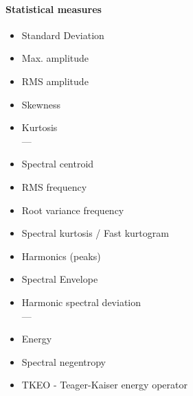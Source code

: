 \paragraph{Statistical measures}
\begin{itemize}
\item Standard Deviation
\item Max. amplitude
\item RMS amplitude
\item Skewness
\item Kurtosis \\
---
\item Spectral centroid
\item RMS frequency
\item Root variance frequency
\item Spectral kurtosis / Fast kurtogram
\item Harmonics (peaks) 
	\cite{hatem_comparative_2018}
	\cite{bishop_multi-scale_2018}
	\cite{adikaram_non-parametric_2016}
	\cite{gerber_identification_2013}
	\cite{nunes_evaluation_2007}
	\cite{karlof_statistical_2005}
\item Spectral Envelope
\item Harmonic spectral deviation \\
---
\item Energy
\item Spectral negentropy
	\cite{avoci_spectral_2020}
\item TKEO - Teager-Kaiser energy operator
	\cite{shi_application_2022}
\end{itemize}

